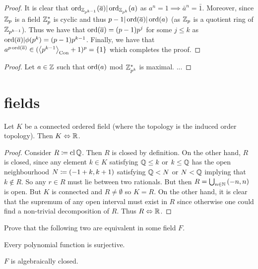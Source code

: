 \documentclass[8pt,a4paper]{article}
\begin{document}
\begin{proof}
    It is clear that $\mathop\mathrm{ord}_{\mathbb{Z}_{p^{k-1}}}(\overline{a})|\mathop\mathrm{ord}_{\mathbb{Z}_{p^k}}(a)$ as $a^n=1\implies \bar{a}^n=\bar{1}$. Moreover, since $\mathbb{Z}_p$ is a field $\mathbb{Z}^*_p$ is cyclic and thus $p-1|\mathop\mathrm{ord}(\overline{a})|\mathop\mathrm{ord}(a)$ (as $\mathbb{Z}_p$ is a quotient ring of $\mathbb{Z}_{p^{k-1}}$). Thus we have that $\mathop\mathrm{ord}(\overline{a})=(p-1)p^j$ for some $j\leq k$ as $\mathop\mathrm{ord}(\overline{a})|\phi(p^k)=(p-1)p^{k-1}$. Finally, we have that $a^{p\ord(\bar{a})}\in (\gen{p^{k-1}}_{\Con}+1)^p=\set{1}$ which completes the proof.
\end{proof}

\begin{proof}
    Let $a\in \mathbb{Z}$ such that $\mathop\mathrm{ord}(a)$ mod $\mathbb{Z}^*_{p^k}$ is maximal. ...
\end{proof}

\section{fields}

\begin{lemma}
    Let $K$ be a connected ordered field (where the topology is the induced order topology). Then $K\Leftrightarrow \mathbb{R}$. 
\end{lemma}

\begin{proof}
    Consider $R\mathrel{\mathrel{\mathop:}\mkern-1.2mu=}\mathop\mathrm{cl} \mathbb{Q}$. Then $R$ is closed by definition. On the other hand, $R$ is closed, since any element $k\in K$ satisfying $\mathbb{Q} \leq k$ or $k \leq \mathbb{Q}$ has the open neighbourhood $N\mathrel{\mathrel{\mathop:}\mkern-1.2mu=} (-1+k,k+1)$ satisfying $\mathbb{Q} < N$ or $N < \mathbb{Q}$ implying that $k\not\in R$. So any $r\in R$ must lie between two rationals. But then $R=\bigcup_{n\in\mathbb{N}}{(-n,n)}$ is open. But $K$ is connected and $R\neq\emptyset$ so $K=R$. On the other hand, it is clear that the supremum of any open interval must exist in $R$ since otherwise one could find a non-trivial decomposition of $R$. Thus $R\Leftrightarrow \mathbb{R}$. 
\end{proof}

\begin{exercise}
    Prove that the following two are equivalent in some field $F$.
    \begin{statements}
        \item Every polynomial function is surjective.
        \item $F$ is algebraically closed.
    \end{statements}
\end{exercise}
\end{document}
